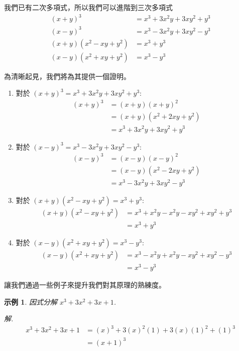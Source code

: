 \documentclass[12pt]{article}
\newtheorem{example}{示例}
\begin{document}
    我們已有二次多項式，所以我們可以進階到三次多項式\begin{align*}
        (x+y)^3&=x^3+3x^2y+3xy^2+y^3\\
        (x-y)^3&=x^3-3x^2y+3xy^2-y^3\\
        (x+y)(x^2-xy+y^2)&=x^3+y^3\\
        (x-y)(x^2+xy+y^2)&=x^3-y^3
    \end{align*}

    為清晰起見，我們將為其提供一個證明。\begin{enumerate}
        \item 對於 $(x+y)^3=x^3+3x^2y+3xy^2+y^3$:\begin{align*}
            (x+y)^3&=(x+y)(x+y)^2\\
            &=(x+y)(x^2+2xy+y^2)\\
            &=x^3+3x^2y+3xy^2+y^3
        \end{align*}
        \item 對於 $(x-y)^3=x^3-3x^2y+3xy^2-y^3$:\begin{align*}
            (x-y)^3&=(x-y)(x-y)^2\\
            &=(x-y)(x^2-2xy+y^2)\\
            &=x^3-3x^2y+3xy^2-y^3
        \end{align*}
        \item 對於 $(x+y)(x^2-xy+y^2)=x^3+y^3$:\begin{align*}
            (x+y)(x^2-xy+y^2)&=x^3+x^2y-x^2y-xy^2+xy^2+y^3\\
            &=x^3+y^3
        \end{align*}
        \item 對於 $(x-y)(x^2+xy+y^2)=x^3-y^3$:\begin{align*}
            (x-y)(x^2+xy+y^2)&=x^3-x^2y+x^2y-xy^2+xy^2-y^3\\
            &=x^3-y^3
        \end{align*}
    \end{enumerate}
    
    讓我們通過一些例子來提升我們對其原理的熟練度。

    \begin{example}
        因式分解 $x^3+3x^2+3x+1$.
    \end{example}
    \textit{ 解. }\begin{align*}
        x^3+3x^2+3x+1&=(x)^3+3(x)^2(1)+3(x)(1)^2+(1)^3\\
        &=(x+1)^3
    \end{align*}
\end{document}
